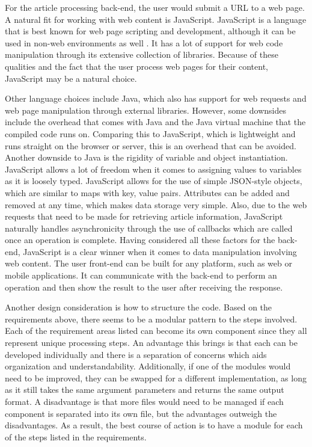 \documentclass[11pt,titlepage]{report}
\begin{document}
For the article processing back-end, the user would submit a URL to a web page. A natural fit for working with web content is JavaScript. JavaScript is a language that is best known for web page scripting and development, although it can be used in non-web environments as well \cite{javascript_info}. It has a lot of support for web code manipulation through its extensive collection of libraries. Because of these qualities and the fact that the user process web pages for their content, JavaScript may be a natural choice. 

Other language choices include Java, which also has support for web requests and web page manipulation through external libraries. However, some downsides include the overhead that comes with Java and the Java virtual machine that the compiled code runs on. Comparing this to JavaScript, which is lightweight and runs straight on the browser or server, this is an overhead that can be avoided. Another downside to Java is the rigidity of variable and object instantiation. JavaScript allows a lot of freedom when it comes to assigning values to variables as it is loosely typed. JavaScript allows for the use of simple JSON-style objects, which are similar to maps with key, value pairs. Attributes can be added and removed at any time, which makes data storage very simple. Also, due to the web requests that need to be made for retrieving article information, JavaScript naturally handles asynchronicity through the use of callbacks which are called once an operation is complete. Having considered all these factors for the back-end, JavaScript is a clear winner when it comes to data manipulation involving web content. The user front-end can be built for any platform, such as web or mobile applications. It can communicate with the back-end to perform an operation and then show the result to the user after receiving the response.

Another design consideration is how to structure the code. Based on the requirements above, there seems to be a modular pattern to the steps involved. Each of the requirement areas listed can become its own component since they all represent unique processing steps. An advantage this brings is that each can be developed individually and there is a separation of concerns which aids organization and understandability. Additionally, if one of the modules would need to be improved, they can be swapped for a different implementation, as long as it still takes the same argument parameters and returns the same output format. A disadvantage is that more files would need to be managed if each component is separated into its own file, but the advantages outweigh the disadvantages. As a result, the best course of action is to have a module for each of the steps listed in the requirements.
\end{document}
